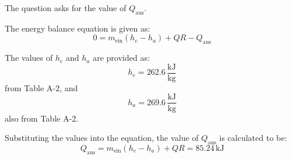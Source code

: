 The question asks for the value of \( Q_{\text{aus}} \).

The energy balance equation is given as:
\[ 0 = m_{\text{ein}} (h_e - h_a) + QR - Q_{\text{aus}} \]

The values of \( h_e \) and \( h_a \) are provided as:
\[ h_e = 262.6 \, \frac{\text{kJ}}{\text{kg}} \] from Table A-2, and 
\[ h_a = 269.6 \, \frac{\text{kJ}}{\text{kg}} \] also from Table A-2.

Substituting the values into the equation, the value of \( Q_{\text{aus}} \) is calculated to be:
\[ Q_{\text{aus}} = m_{\text{ein}} (h_e - h_a) + QR = 85.24 \, \text{kJ} \]